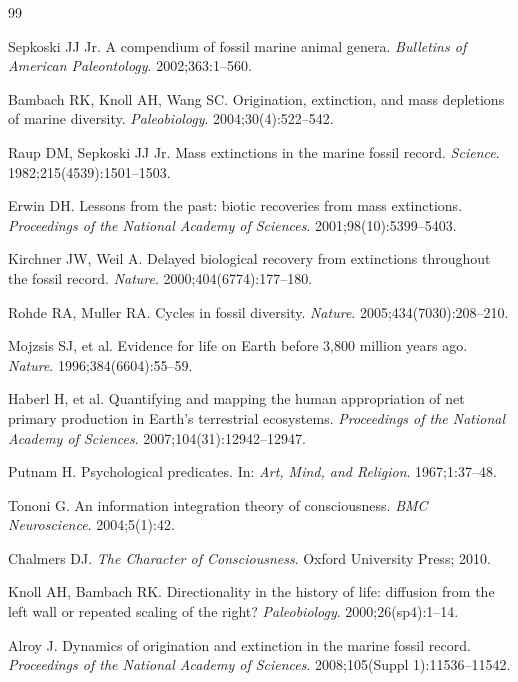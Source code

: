 \documentclass[10pt,letterpaper]{article}
\begin{document}
\begin{thebibliography}{99}

Sepkoski JJ Jr. A compendium of fossil marine animal genera.
\emph{Bulletins of American Paleontology}. 2002;363:1--560.

Bambach RK, Knoll AH, Wang SC. Origination, extinction, and mass depletions of marine diversity.
\emph{Paleobiology}. 2004;30(4):522--542.

Raup DM, Sepkoski JJ Jr. Mass extinctions in the marine fossil record.
\emph{Science}. 1982;215(4539):1501--1503.

Erwin DH. Lessons from the past: biotic recoveries from mass extinctions.
\emph{Proceedings of the National Academy of Sciences}. 2001;98(10):5399--5403.

Kirchner JW, Weil A. Delayed biological recovery from extinctions throughout the fossil record.
\emph{Nature}. 2000;404(6774):177--180.

Rohde RA, Muller RA. Cycles in fossil diversity.
\emph{Nature}. 2005;434(7030):208--210.

Mojzsis SJ, et al. Evidence for life on Earth before 3,800 million years ago.
\emph{Nature}. 1996;384(6604):55--59.

Haberl H, et al. Quantifying and mapping the human appropriation of net primary production
in Earth's terrestrial ecosystems.
\emph{Proceedings of the National Academy of Sciences}. 2007;104(31):12942--12947.

Putnam H. Psychological predicates. In: \emph{Art, Mind, and Religion}. 1967;1:37--48.

Tononi G. An information integration theory of consciousness.
\emph{BMC Neuroscience}. 2004;5(1):42.

Chalmers DJ. \emph{The Character of Consciousness}. Oxford University Press; 2010.

Knoll AH, Bambach RK. Directionality in the history of life: diffusion from the left wall
or repeated scaling of the right?
\emph{Paleobiology}. 2000;26(sp4):1--14.

Alroy J. Dynamics of origination and extinction in the marine fossil record.
\emph{Proceedings of the National Academy of Sciences}. 2008;105(Suppl 1):11536--11542.


\end{thebibliography}
\end{document}

